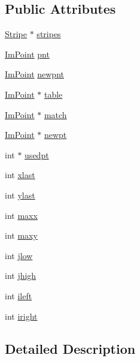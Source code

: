 \subsection*{Public Attributes}
\begin{DoxyCompactItemize}
\item 
\mbox{\hyperlink{struct_stripe}{Stripe}} $\ast$ \mbox{\hyperlink{struct_point_def_a5bee789a974c549763b215a62d6d0e49}{stripes}}
\item 
\mbox{\hyperlink{struct_im_point}{Im\+Point}} \mbox{\hyperlink{struct_point_def_a57d6fc91e962f787ae4b3f10dffce2d3}{pnt}}
\item 
\mbox{\hyperlink{struct_im_point}{Im\+Point}} \mbox{\hyperlink{struct_point_def_a72fbff29bd56d693d97add03b2c644e7}{newpnt}}
\item 
\mbox{\hyperlink{struct_im_point}{Im\+Point}} $\ast$ \mbox{\hyperlink{struct_point_def_a5edc03772cc495cf4cd39a5ce4c4d312}{table}}
\item 
\mbox{\hyperlink{struct_im_point}{Im\+Point}} $\ast$ \mbox{\hyperlink{struct_point_def_a038293d4526cf9fbc6dbde3d27e2d115}{match}}
\item 
\mbox{\hyperlink{struct_im_point}{Im\+Point}} $\ast$ \mbox{\hyperlink{struct_point_def_a0b0c2f5e7044400abf72259c16551440}{newpt}}
\item 
int $\ast$ \mbox{\hyperlink{struct_point_def_a70b6cd480af28582e3048fa8272563f3}{usedpt}}
\item 
int \mbox{\hyperlink{struct_point_def_a67add660c1003a776016ea794a4a6e77}{xlast}}
\item 
int \mbox{\hyperlink{struct_point_def_afaedb9e75bd0d7252b0bd95abc4b77d4}{ylast}}
\item 
int \mbox{\hyperlink{struct_point_def_aae00e1102867c41db8dd02c849154602}{maxx}}
\item 
int \mbox{\hyperlink{struct_point_def_a5c7209ffaa60b839883b45681f98641f}{maxy}}
\item 
int \mbox{\hyperlink{struct_point_def_a8e8906fb29744653229c1432d0783b71}{jlow}}
\item 
int \mbox{\hyperlink{struct_point_def_a45479f24a2ba580ca93b59772885b6eb}{jhigh}}
\item 
int \mbox{\hyperlink{struct_point_def_a667c90c1b37053ec95b6038f44fa48de}{ileft}}
\item 
int \mbox{\hyperlink{struct_point_def_a2c7e8235ddfc4893192cc9cc555df4dc}{iright}}
\end{DoxyCompactItemize}


\subsection{Detailed Description}


